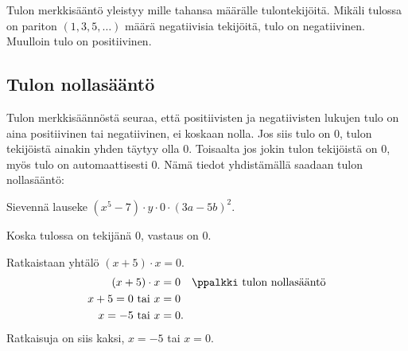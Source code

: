Tulon merkkisääntö yleistyy mille tahansa määrälle tulontekijöitä.
Mikäli tulossa on pariton $(1, 3, 5, \ldots)$ määrä negatiivisia tekijöitä, tulo on negatiivinen.
Muulloin tulo on positiivinen.


\newpage

\subsection*{Tulon nollasääntö}

Tulon merkkisäännöstä seuraa, että positiivisten ja negatiivisten lukujen tulo on aina positiivinen tai negatiivinen, ei koskaan nolla.
Jos siis tulo on $0$, tulon tekijöistä ainakin yhden täytyy olla $0$.
Toisaalta jos jokin tulon tekijöistä on $0$, myös tulo on automaattisesti $0$.
Nämä tiedot yhdistämällä saadaan tulon nollasääntö:


\begin{esimerkki}
Sievennä lauseke $(x^5-7)\cdot y \cdot 0\cdot(3a-5b)^2$.
    \begin{esimratk}
	Koska tulossa on tekijänä $0$, vastaus on $0$.
    \end{esimratk}
\end{esimerkki}

\begin{esimerkki} Ratkaistaan yhtälö $(x+5) \cdot x =0 $.
    \begin{align*}
        (x+5)\cdot x &=0 \quad \ppalkki \text{ tulon nollasääntö} \\
        x +5= 0 \text{ tai } x &=0 \\
        x= -5 \text{ tai } x &=0.
    \end{align*}
    Ratkaisuja on siis kaksi, $x= -5$ tai $x= 0$.
\end{esimerkki}


